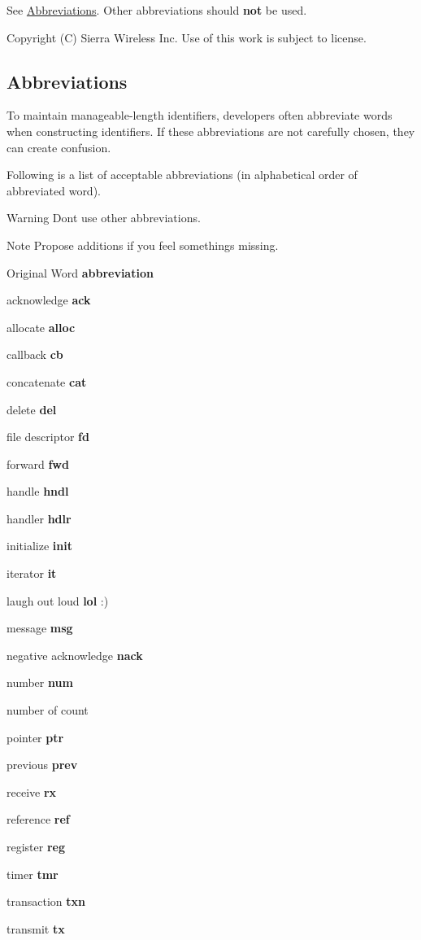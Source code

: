 See \hyperlink{ccodingStdsAbbr}{Abbreviations}. Other abbreviations should {\bfseries not} be used.





Copyright (C) Sierra Wireless Inc. Use of this work is subject to license. \hypertarget{ccodingStdsAbbr}{}\subsection{Abbreviations}\label{ccodingStdsAbbr}
To maintain manageable-\/length identifiers, developers often abbreviate words when constructing identifiers. If these abbreviations are not carefully chosen, they can create confusion.

Following is a list of acceptable abbreviations (in alphabetical order of abbreviated word). \begin{DoxyWarning}{Warning}
Don\textquotesingle{}t use other abbreviations.
\end{DoxyWarning}
\begin{DoxyNote}{Note}
Propose additions if you feel something\textquotesingle{}s missing.
\end{DoxyNote}
Original Word {\bfseries abbreviation} 


\begin{DoxyItemize}
\item acknowledge {\bfseries ack} 
\item allocate {\bfseries alloc} 
\item callback {\bfseries cb} 
\item concatenate {\bfseries cat} 
\item delete {\bfseries del} 
\item file descriptor {\bfseries fd} 
\item forward {\bfseries fwd} 
\item handle {\bfseries hndl} 
\item handler {\bfseries hdlr} 
\item initialize {\bfseries init} 
\item iterator {\bfseries it} 
\item laugh out loud {\bfseries lol} \+:)
\item message {\bfseries msg} 
\item negative acknowledge {\bfseries nack} 
\item number {\bfseries num} 
\item number of count
\item pointer {\bfseries ptr} 
\item previous {\bfseries prev} 
\item receive {\bfseries rx} 
\item reference {\bfseries ref} 
\item register {\bfseries reg} 
\item timer {\bfseries tmr} 
\item transaction {\bfseries txn} 
\item transmit {\bfseries tx} 
\end{DoxyItemize}

